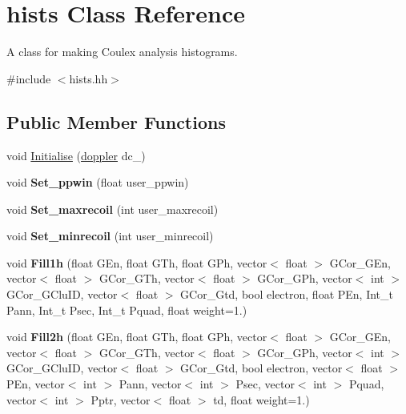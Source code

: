 \hypertarget{classhists}{}\section{hists Class Reference}
\label{classhists}


A class for making Coulex analysis histograms.  




{\ttfamily \#include $<$hists.\+hh$>$}

\subsection*{Public Member Functions}
\begin{DoxyCompactItemize}
\item 
void \hyperlink{classhists_affb3dcaefba3b63d20bbe438030e2f81}{Initialise} (\hyperlink{classdoppler}{doppler} dc\+\_\+)
\item 
\mbox{\label{classhists_a98cf7d91940c6d77105d07b0783399ee}} 
void {\bfseries Set\+\_\+ppwin} (float user\+\_\+ppwin)
\item 
\mbox{\label{classhists_ae986e831e139c9e7e5a4e327e864484d}} 
void {\bfseries Set\+\_\+maxrecoil} (int user\+\_\+maxrecoil)
\item 
\mbox{\label{classhists_acfb845682216224712565e7b8a1c3ce2}} 
void {\bfseries Set\+\_\+minrecoil} (int user\+\_\+minrecoil)
\item 
\mbox{\label{classhists_a4cc3927b58899125a7691a50101fb902}} 
void {\bfseries Fill1h} (float G\+En, float G\+Th, float G\+Ph, vector$<$ float $>$ G\+Cor\+\_\+\+G\+En, vector$<$ float $>$ G\+Cor\+\_\+\+G\+Th, vector$<$ float $>$ G\+Cor\+\_\+\+G\+Ph, vector$<$ int $>$ G\+Cor\+\_\+\+G\+Clu\+ID, vector$<$ float $>$ G\+Cor\+\_\+\+Gtd, bool electron, float P\+En, Int\+\_\+t Pann, Int\+\_\+t Psec, Int\+\_\+t Pquad, float weight=1.)
\item 
\mbox{\label{classhists_a84e3dd3dc98652844bbfea63652eb280}} 
void {\bfseries Fill2h} (float G\+En, float G\+Th, float G\+Ph, vector$<$ float $>$ G\+Cor\+\_\+\+G\+En, vector$<$ float $>$ G\+Cor\+\_\+\+G\+Th, vector$<$ float $>$ G\+Cor\+\_\+\+G\+Ph, vector$<$ int $>$ G\+Cor\+\_\+\+G\+Clu\+ID, vector$<$ float $>$ G\+Cor\+\_\+\+Gtd, bool electron, vector$<$ float $>$ P\+En, vector$<$ int $>$ Pann, vector$<$ int $>$ Psec, vector$<$ int $>$ Pquad, vector$<$ int $>$ Pptr, vector$<$ float $>$ td, float weight=1.)

\end{DoxyCompactItemize}
